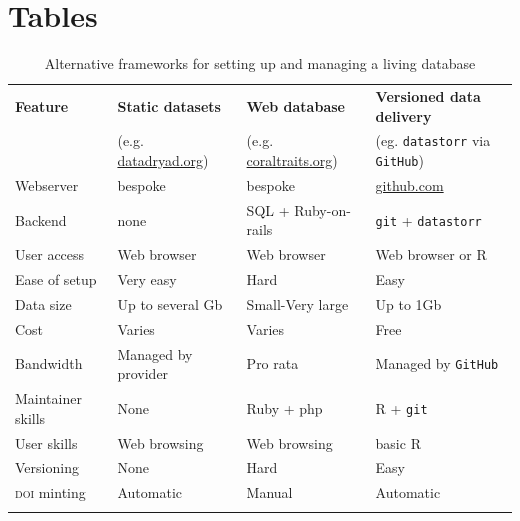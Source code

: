 \documentclass[a4paper,11pt]{article}
\newcommand{\smurl}[1]{{\footnotesize\url{#1}}}
\begin{document}
\newpage

\section{Tables}

\begin{table}[h!]
\centering
\caption{Alternative frameworks for setting up and managing a living database}
{\footnotesize
\vspace{1cm}
  \begin{tabular}{p{2.5cm}p{3.5cm}p{3.5cm}p{4cm}}
  \hline
  \textbf{Feature} & \textbf{Static datasets}& \textbf{Web database} & \textbf{Versioned data delivery}\\
  \textbf{} & (e.g. \smurl{datadryad.org})& (e.g. \smurl{coraltraits.org}) & (eg. \texttt{datastorr} via \texttt{GitHub})\\
  \hline
   Webserver        & bespoke & bespoke &  \smurl{github.com}\\
   Backend          & none & SQL + Ruby-on-rails 			& \texttt{git} + \texttt{datastorr} \\
   User access      & Web browser & Web browser 				    & Web browser or R \\
   Ease of setup    & Very easy & Hard 							& Easy\\
   Data size        & Up to several Gb & Small-Very large 				& Up to 1Gb\\
   Cost             & Varies & Varies  						& Free \\
   Bandwidth        & Managed by provider & Pro rata 						& Managed by \texttt{GitHub}\\
   Maintainer skills & None & Ruby + php 					& R + \texttt{git} \\
   User skills      &Web browsing& Web browsing  					& basic R \\
   Versioning       &None& Hard 							& Easy \\
   \textsc{doi} minting      &Automatic & Manual 					& Automatic \\
  \hline 
  \\
 
  \end{tabular}
  } 
\label{tab:publishing_models}
\end{table}

\newpage
\end{document}

